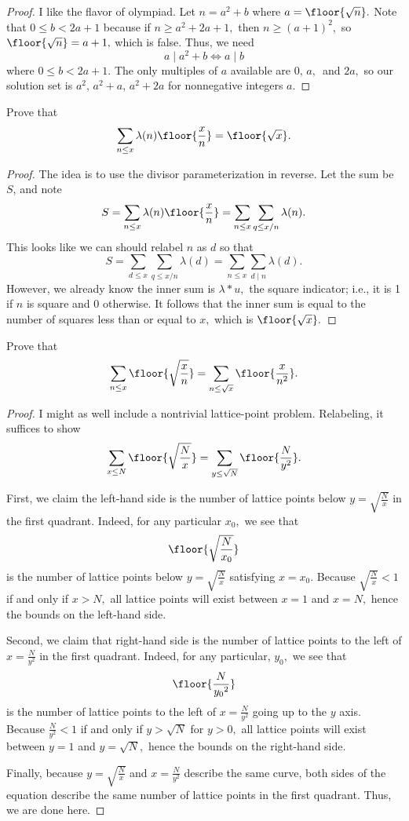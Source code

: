 \begin{proof}
I like the flavor of olympiad. Let $n=a^2+b$ where $a=\floor{\sqrt n}.$ Note that $0\le b<2a+1$ because if $n\ge a^2+2a+1,$ then $n\ge(a+1)^2,$ so $\floor{\sqrt n}=a+1,$ which is false. Thus, we need
\[a\mid a^2+b\iff a\mid b\]
where $0\le b<2a+1.$ The only multiples of $a$ available are $0,\,a,\,$ and $2a,$ so our solution set is $\boxed{a^2,\,a^2+a,\,a^2+2a}$ for nonnegative integers $a.$
\end{proof}

\begin{exercise}[23]
Prove that
\[\sum_{n\le x}\lambda(n)\floor{\frac xn}=\floor{\sqrt x}.\]
\end{exercise}

\begin{proof}
The idea is to use the divisor parameterization in reverse. Let the sum be $S$, and note
\[S=\sum_{n\le x}\lambda(n)\floor{\frac xn}=\sum_{n\le x}\sum_{q\le x/n}\lambda(n).\]
This looks like we can should relabel $n$ as $d$ so that
\[S=\sum_{d\le x}\sum_{q\le x/n}\lambda(d)=\sum_{n\le x}\sum_{d\mid n}\lambda(d).\]
However, we already know the inner sum is $\lambda*u,$ the square indicator; i.e., it is 1 if $n$ is square and 0 otherwise. It follows that the inner sum is equal to the number of squares less than or equal to $x,$ which is $\floor{\sqrt x}.$
\end{proof}

\begin{exercise}
Prove that
\[\sum_{n\le x}\floor{\sqrt{\frac xn}}=\sum_{n\le\sqrt x}\floor{\frac x{n^2}}.\]
\end{exercise}

\begin{proof}
I might as well include a nontrivial lattice-point problem. Relabeling, it suffices to show
\[\sum_{x\le N}\floor{\sqrt{\frac Nx}}=\sum_{y\le\sqrt N}\floor{\frac N{y^2}}.\]

First, we claim the left-hand side is the number of lattice points below $y=\sqrt{\frac Nx}$ in the first quadrant. Indeed, for any particular $x_0,$ we see that
\[\floor{\sqrt{\frac N{x_0}}}\]
is the number of lattice points below $y=\sqrt{\frac Nx}$ satisfying $x=x_0.$ Because $\sqrt{\frac Nx}<1$ if and only if $x>N,$ all lattice points will exist between $x=1$ and $x=N,$ hence the bounds on the left-hand side.

Second, we claim that right-hand side is the number of lattice points to the left of $x=\frac N{y^2}$ in the first quadrant. Indeed, for any particular, $y_0,$ we see that
\[\floor{\frac N{{y_0}^2}}\]
is the number of lattice points to the left of $x=\frac N{y^2}$ going up to the $y$ axis. Because $\frac N{y^2}<1$ if and only if $y>\sqrt N$ for $y>0,$ all lattice points will exist between $y=1$ and $y=\sqrt N,$ hence the bounds on the right-hand side.

Finally, because $y=\sqrt{\frac Nx}$ and $x=\frac N{y^2}$ describe the same curve, both sides of the equation describe the same number of lattice points in the first quadrant. Thus, we are done here.
\end{proof}